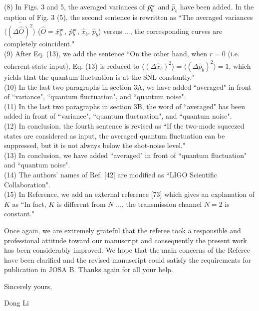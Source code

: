 \documentclass[10pt]{article}
\begin{document}
(8) In Figs. 3 and 5, the averaged variances of $\hat{p}_b^{\rm{w}}$ and $\hat{p}_b$ have been added. In the caption of Fig. 3 (5), the second sentence is rewritten as ``The averaged variances $\overline{\langle (\Delta \hat{O})^2 \rangle}$ ($\hat{O} =$$\hat{x}_b^{\rm{w}}$, $\hat{p}_b^{\rm{w}}$, $\hat{x}_b$, $\hat{p}_b$) versus ..., the corresponding curves are completely coincident."\\
(9) After Eq. (13), we add the sentence ``On the other hand, when $r=0$ (i.e. coherent-state input), Eq. (13) is reduced to $\overline{\langle (\Delta \hat{x}_{b})^2 \rangle} = \overline{\langle (\Delta \hat{p}_{b})^2 \rangle} = 1$, which yields that the quantum fluctuation is at the SNL constantly."\\
(10) In the last two paragraphs in section 3A, we have added ``averaged" in front of ``variance", ``quantum fluctuation", and ``quantum noise".\\
(11) In the last two paragraphs in section 3B, the word of ``averaged" has been added in front of ``variance", ``quantum fluctuation", and ``quantum noise".\\
(12) In conclusion, the fourth sentence is revised as ``If the two-mode squeezed states are considered as input, the averaged quantum fluctuation can be suppressed, but it is not always below the shot-noise level."\\
(13) In conclusion, we have added ``averaged" in front of ``quantum fluctuation" and ``quantum noise".\\
(14) The authors' names of Ref. [42] are modified as ``LIGO Scientific Collaboration".\\
(15) In Reference, we add an external reference [73] which gives an explanation of $K$ as ``In fact, $K$ is different from $N$ ..., the transmission channel $N=2$ is constant."



Once again, we are extremely grateful that the referee took a responsible and professional attitude toward our manuscript and consequently the present work has been considerably improved. We hope that the main concerns of the Referee have been clariﬁed and the revised manuscript could satisfy the requirements for publication in JOSA B. Thanks again for all your help.


\vspace{10mm}

Sincerely yours,

Dong Li
\end{document}

